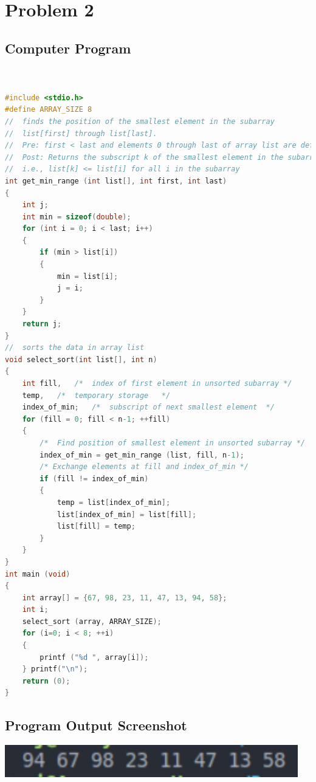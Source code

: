 \section{{Problem 2}}
	
		\subsection{{Computer Program}}
	
			\begin{lstlisting}[language=C, caption=\textit{}]	


#include <stdio.h>
#define ARRAY_SIZE 8
//  finds the position of the smallest element in the subarray
//  list[first] through list[last].
//  Pre: first < last and elements 0 through last of array list are defined.
//  Post: Returns the subscript k of the smallest element in the subarray;
//  i.e., list[k] <= list[i] for all i in the subarray
int get_min_range (int list[], int first, int last)
{
    int j;
    int min = sizeof(double);
    for (int i = 0; i < last; i++)
    {
        if (min > list[i])
        {
            min = list[i];
            j = i;
        }
    }
    return j;
}
//  sorts the data in array list
void select_sort(int list[], int n)
{
    int fill,   /*  index of first element in unsorted subarray */
    temp,   /*  temporary storage   */
    index_of_min;   /*  subscript of next smallest element  */
    for (fill = 0; fill < n-1; ++fill)
    {
        /*  Find position of smallest element in unsorted subarray */
        index_of_min = get_min_range (list, fill, n-1);
        /* Exchange elements at fill and index_of_min */
        if (fill != index_of_min)
        {
            temp = list[index_of_min];
            list[index_of_min] = list[fill];
            list[fill] = temp;
        }
    }
}
int main (void)
{
    int array[] = {67, 98, 23, 11, 47, 13, 94, 58};
    int i;
    select_sort (array, ARRAY_SIZE);
    for (i=0; i < 8; ++i)
    {
        printf ("%d ", array[i]);
    } printf("\n");
    return (0);
}

	\end{lstlisting}

		\subsection{{Program Output Screenshot}}
			
			{}
			
			\includegraphics[width=12.75cm]{problem2.png}


